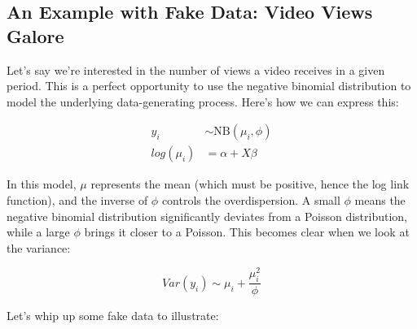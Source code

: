 \documentclass[
  letterpaper,
  DIV=11,
  numbers=noendperiod]{scrreprt}
\begin{document}
\subsection{An Example with Fake Data: Video Views
Galore}\label{an-example-with-fake-data-video-views-galore}

Let's say we're interested in the number of views a video receives in a
given period. This is a perfect opportunity to use the negative binomial
distribution to model the underlying data-generating process. Here's how
we can express this:

\[
\begin{aligned}
y_i  & \sim \text{NB}(\mu_i, \phi) \\
log(\mu_i)  & = \alpha + X\beta
\end{aligned}
\]

In this model, \(\mu\) represents the mean (which must be positive,
hence the log link function), and the inverse of \(\phi\) controls the
overdispersion. A small \(\phi\) means the negative binomial
distribution significantly deviates from a Poisson distribution, while a
large \(\phi\) brings it closer to a Poisson. This becomes clear when we
look at the variance:

\[
Var(y_i)  \sim \mu_i + \frac{\mu_i^2}{\phi}
\]

Let's whip up some fake data to illustrate:
\end{document}
